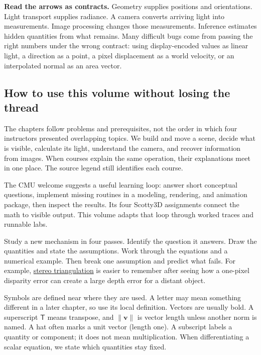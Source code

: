 \textbf{Read the arrows as contracts.} Geometry supplies positions and orientations. Light transport supplies radiance. A camera converts arriving light into measurements. Image processing changes those measurements. Inference estimates hidden quantities from what remains. Many difficult bugs come from passing the right numbers under the wrong contract: using display-encoded values as linear light, a direction as a point, a pixel displacement as a world velocity, or an interpolated normal as an area vector.

\subsection{How to use this volume without losing the thread}\label{03-visual-computing-i-ch001-how-to-use-this-volume-without-losing-the-thread}

\hypertarget{03-visual-computing-i-ch001-how-to-use-this-volume-without-losing-the-thread}{}

The chapters follow problems and prerequisites, not the order in which four instructors presented overlapping topics. We build and move a scene, decide what is visible, calculate its light, understand the camera, and recover information from images. When courses explain the same operation, their explanations meet in one place. The source legend still identifies each course.

The CMU welcome suggests a useful learning loop: answer short conceptual questions, implement missing routines in a modeling, rendering, and animation package, then inspect the results. Its four Scotty3D assignments connect the math to visible output. This volume adapts that loop through worked traces and runnable labs.

Study a new mechanism in four passes. Identify the question it answers. Draw the quantities and state the assumptions. Work through the equations and a numerical example. Then break one assumption and predict what fails. For example, \hyperref[appendix-c4e98b6e4001]{stereo triangulation} is easier to remember after seeing how a one-pixel disparity error can create a large depth error for a distant object.

Symbols are defined near where they are used. A letter may mean something different in a later chapter, so use its local definition. Vectors are usually bold. A superscript \(\mathsf T\) means transpose, and \(\|\mathbf v\|\) is vector length unless another norm is named. A hat often marks a unit vector (length one). A subscript labels a quantity or component; it does not mean multiplication. When differentiating a scalar equation, we state which quantities stay fixed.

